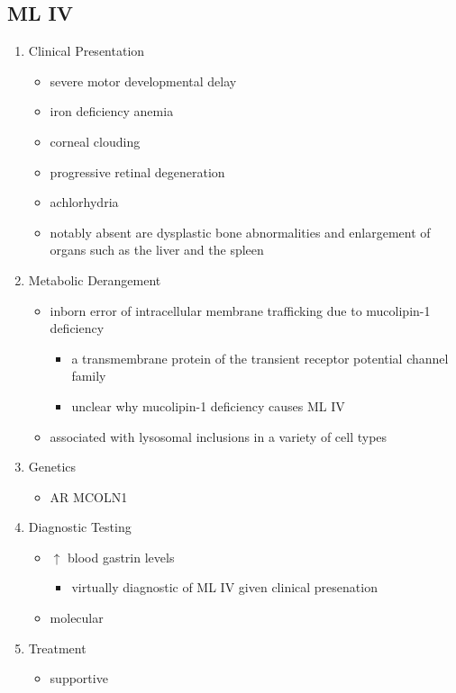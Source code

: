 \documentclass{scrartcl}
\begin{document}
\subsection{ML IV}
\label{sec:org762ec24}
\begin{enumerate}
\item Clinical Presentation
\label{sec:org751859d}
\begin{itemize}
\item severe motor developmental delay
\item iron deficiency anemia
\item corneal clouding
\item progressive retinal degeneration
\item achlorhydria
\end{itemize}
\begin{itemize}
\item notably absent are dysplastic bone abnormalities and enlargement of
organs such as the liver and the spleen
\end{itemize}

\item Metabolic Derangement
\label{sec:orgcb8d0ef}
\begin{itemize}
\item inborn error of intracellular membrane trafficking due to mucolipin-1 deficiency
\begin{itemize}
\item a transmembrane protein of the transient receptor potential channel family
\item unclear why  mucolipin-1 deficiency causes ML IV
\end{itemize}
\item associated with lysosomal inclusions in a variety of cell types
\end{itemize}
\item Genetics
\label{sec:org07e7551}
\begin{itemize}
\item AR MCOLN1
\end{itemize}
\item Diagnostic Testing
\label{sec:orgc8c24d3}
\begin{itemize}
\item \(\uparrow\) blood gastrin levels
\begin{itemize}
\item virtually diagnostic of ML IV given clinical presenation
\end{itemize}
\item molecular
\end{itemize}

\item Treatment
\label{sec:org94c4547}
\begin{itemize}
\item supportive
\end{itemize}
\end{enumerate}
\end{document}
